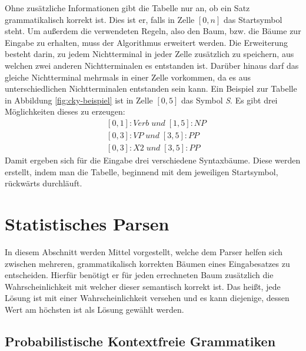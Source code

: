 Ohne zusätzliche Informationen gibt die Tabelle nur an, ob ein Satz grammatikalisch korrekt ist. Dies ist er, falls in Zelle \([0, n]\) das Startsymbol steht. Um außerdem die verwendeten Regeln, also den Baum, bzw. die Bäume zur Eingabe zu erhalten, muss der Algorithmus erweitert werden. Die Erweiterung besteht darin, zu jedem Nichtterminal in jeder Zelle zusätzlich zu speichern, aus welchen zwei anderen Nichtterminalen es entstanden ist. Darüber hinaus darf das gleiche Nichtterminal mehrmals in einer Zelle vorkommen, da es aus unterschiedlichen Nichtterminalen entstanden sein kann. Ein Beispiel zur Tabelle in Abbildung \ref{fig:cky-beispiel} ist in Zelle \([0, 5]\) das Symbol \textit{S}. Es gibt drei Möglichkeiten dieses zu erzeugen: 
\begin{align}
& [0, 1]:Verb \; und\; [1, 5]:NP \nonumber \\ & [0, 3]:VP \; und \; [3, 5]:PP \nonumber \\ & [0, 3]:X2 \; und \; [3, 5]:PP
\end{align}
Damit ergeben sich für die Eingabe drei verschiedene Syntaxbäume. Diese werden erstellt, indem man die Tabelle, beginnend mit dem jeweiligen Startsymbol, rückwärts durchläuft.

\section{Statistisches Parsen}
\label{sec:nlp:stat-parsen}

In diesem Abschnitt werden Mittel vorgestellt, welche dem Parser helfen sich zwischen mehreren, grammatikalisch korrekten Bäumen eines Eingabesatzes zu entscheiden. Hierfür benötigt er für jeden errechneten Baum zusätzlich die Wahrscheinlichkeit mit welcher dieser semantisch korrekt ist. Das heißt, jede Lösung ist mit einer Wahrscheinlichkeit versehen und es kann diejenige, dessen Wert am höchsten ist als Lösung gewählt werden. %

\subsection{Probabilistische Kontextfreie Grammatiken}
\label{sec:nlp:stat-parsen:pcfg}

